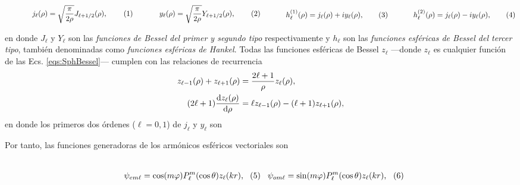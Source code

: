 	\begin{subequations}
	\eqhalf{j_\ell (\rho) = \sqrt{\frac{\pi}{2\rho}} J_{\ell+1/2}(\rho), \label{eq:jn}}
	\eqhalf{y_\ell (\rho) = \sqrt{\frac{\pi}{2\rho}} Y_{\ell+1/2}(\rho), \label{eq:yn}}
	\eqhalf{h_\ell^{(1)} (\rho) = j_\ell(\rho) + i y_\ell(\rho), \label{eq:h1}}
	\eqhalf{h_\ell^{(2)} (\rho) =  j_\ell(\rho) - i y_\ell(\rho), \label{eq:h2}}
	\label{eqs:SphBessel}
	\end{subequations}

\noindent	
en donde $J_\ell$ y $Y_\ell$ son las \emph{funciones de Bessel del primer y segundo tipo} respectivamente y $h_\ell$ son las \emph{funciones esféricas de Bessel del tercer tipo}, también denominadas como \emph{funciones esféricas de Hankel}. Todas las funciones esféricas de Bessel $z_\ell$ ---donde $z_\ell$ es cualquier función de las Ecs. \eqref{eqs:SphBessel}--- cumplen con las  relaciones de recurrencia
	\begin{align}
	z_{\ell-1}(\rho) + z_{\ell+1}(\rho) &=\frac{2\ell+1}{\rho} z_\ell(\rho),\\
	(2\ell + 1) \dv{z_\ell(\rho)}{\rho} &= \ell z_{\ell-1}(\rho) - (\ell+1)z_{\ell+1}(\rho),
	\end{align}
en donde los primeros dos órdenes ($\ell=0,1$) de $j_\ell$ y $y_\ell$ son


\vspace*{-1em}\noindent
Por tanto, las funciones generadoras de los armónicos esféricos vectoriales son

	\begin{subequations}
	\eqhalf{\psi_{em\ell} = \cos(m\varphi) P_\ell^m( \cos \theta) z_\ell(k r),}
	\eqhalf{\psi_{om\ell} = \sin(m\varphi) P_\ell^m( \cos \theta) z_\ell(k r),}
	\label{eq:psieo}
	\end{subequations}
	
